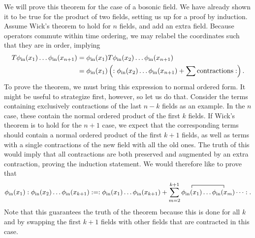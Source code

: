 We will prove this theorem for the case of a bosonic field. We have already shown it to be true for the product of two fields, setting us up for a proof by induction. Assume Wick's theorem to hold for $n$ fields, and add an extra field. Because operators commute within time ordering, we may relabel the coordinates such that they are in order, implying
\begin{align*}
	T\phi_{\text{in}}(x_{1})\dots\phi_{\text{in}}(x_{n + 1}) &= \phi_{\text{in}}(x_{1})T\phi_{\text{in}}(x_{2})\dots\phi_{\text{in}}(x_{n + 1}) \\
	&= \phi_{\text{in}}(x_{1})\left(:\phi_{\text{in}}(x_{2})\dots\phi_{\text{in}}(x_{n + 1}) + \sum\text{contractions}:\right).
\end{align*}
To prove the theorem, we must bring this expression to normal ordered form. It might be useful to strategize first, however, so let us do that. Consider the terms containing exclusively contractions of the last $n - k$ fields as an example. In the $n$ case, these contain the normal ordered product of the first $k$ fields. If Wick's theorem is to hold for the $n + 1$ case, we expect that the corresponding terms should contain a normal ordered product of the first $k + 1$ fields, as well as terms with a single contractions of the new field with all the old ones. The truth of this would imply that all contractions are both preserved and augmented by an extra contraction, proving the induction statement. We would therefore like to prove that
\begin{align*}
	\phi_{\text{in}}(x_{1})\nop{\phi_{\text{in}}(x_{2})\dots\phi_{\text{in}}(x_{k + 1})} = \nop{\phi_{\text{in}}(x_{1})\dots\phi_{\text{in}}(x_{k + 1}) + \sum\limits_{m = 2}^{k + 1}\contraction{}{\phi_{\text{in}}(x_{1})}{\dots}{\phi_{\text{in}}(x_{m})}\phi_{\text{in}}(x_{1})\dots\phi_{\text{in}}(x_{m})\dots}.
\end{align*}
Note that this guarantees the truth of the theorem because this is done for all $k$ and by swapping the first $k + 1$ fields with other fields that are contracted in this case.

